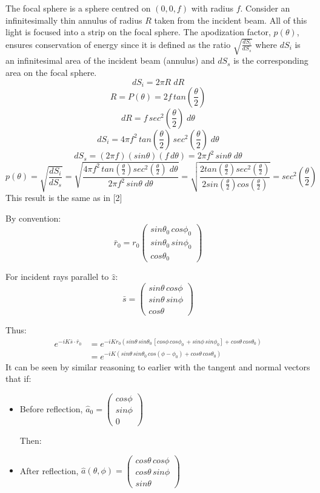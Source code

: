 \documentclass{article}
\begin{document}
    The focal sphere is a sphere centred on \( (0,0,f) \) with radius \(f\). Consider an infinitesimally thin annulus of radius \(R\) taken from the incident beam. All of this light is focused into a strip on the focal sphere. The apodization factor, \(p(\theta)\), ensures conservation of energy since it is defined as the ratio \(\sqrt{\frac{dS_i}{dS_s}}\) where \(dS_i\) is an infinitesimal area of the incident beam (annulus) and \(dS_s\) is the corresponding area on the focal sphere.
    \[dS_i = 2 \pi R \; dR\]
    \[ R = P(\theta) = 2f \, tan\left(\frac{\theta}{2}\right)\]
    \[ dR = f \, sec^2\left(\frac{\theta}{2}\right) \; d\theta \]
    \[ dS_i = 4 \pi f^2 \, tan\left(\frac{\theta}{2}\right) \, sec^2\left(\frac{\theta}{2}\right) \; d\theta \]
    \[ dS_s = (2 \pi f) (sin \theta) (f \, d\theta) = 2 \pi f^2 \, sin \theta  \; d\theta \]
    \[ p(\theta) = \sqrt{\frac{dS_i}{dS_s}} = \sqrt{\frac{4 \pi f^2 \, tan\left(\frac{\theta}{2}\right) sec^2\left(\frac{\theta}{2}\right) \; d\theta}{2 \pi f^2 \, sin \theta \; d\theta}} = \sqrt{\frac{2 tan\left(\frac{\theta}{2}\right) sec^2\left(\frac{\theta}{2}\right) }{2 sin\left(\frac{\theta}{2}\right) cos\left(\frac{\theta}{2}\right)}} = sec^2\left(\frac{\theta}{2}\right) \]
    This result is the same as in [2]

     
    By convention: \[ \bar{r}_0 = r_0 \begin{pmatrix} sin\theta_0 \, cos\phi_0 \\ sin\theta_0 \, sin\phi_0 \\ cos\theta_0\end{pmatrix}\]

    For incident rays parallel to \(\hat{z}\): \[\bar{s} = \begin{pmatrix} sin\theta \, cos\phi \\ sin\theta \, sin\phi \\ cos\theta\end{pmatrix} \]

    Thus: \begin{align*}
    e^{-iK\bar{s}\cdot\bar{r}_0} & = e^{-i K r_0 (sin\theta \, sin\theta_0 \, [cos\phi\, cos\phi_0\, + sin\phi\, sin\phi_0] + cos\theta\, cos\theta_0)}\\ & = e^{-iK(sin\theta\, sin\theta_0\,cos(\phi-\phi_0)+cos\theta\,cos\theta_0)}
    \end{align*}
    It can be seen by similar reasoning to earlier with the tangent and normal vectors that if:
    \begin{itemize}
        \item Before reflection, \(\hat{a}_0 = \begin{pmatrix} cos\phi \\ sin\phi \\ 0 \end{pmatrix}\)
    
    Then:
        \item After reflection, \(\hat{a}(\theta,\phi) = \begin{pmatrix} cos\theta\, cos\phi \\ cos\theta\, sin\phi \\ sin\theta \end{pmatrix}\)
    \end{itemize} 
    
\end{document}
